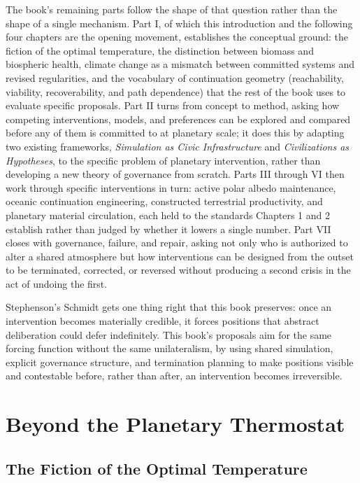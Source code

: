 \documentclass[11pt,oneside]{book}
\begin{document}
The book's remaining parts follow the shape of that question rather than the shape of a single mechanism. Part I, of which this introduction and the following four chapters are the opening movement, establishes the conceptual ground: the fiction of the optimal temperature, the distinction between biomass and biospheric health, climate change as a mismatch between committed systems and revised regularities, and the vocabulary of continuation geometry (reachability, viability, recoverability, and path dependence) that the rest of the book uses to evaluate specific proposals. Part II turns from concept to method, asking how competing interventions, models, and preferences can be explored and compared before any of them is committed to at planetary scale; it does this by adapting two existing frameworks, \textit{Simulation as Civic Infrastructure} and \textit{Civilizations as Hypotheses}, to the specific problem of planetary intervention, rather than developing a new theory of governance from scratch. Parts III through VI then work through specific interventions in turn: active polar albedo maintenance, oceanic continuation engineering, constructed terrestrial productivity, and planetary material circulation, each held to the standards Chapters 1 and 2 establish rather than judged by whether it lowers a single number. Part VII closes with governance, failure, and repair, asking not only who is authorized to alter a shared atmosphere but how interventions can be designed from the outset to be terminated, corrected, or reversed without producing a second crisis in the act of undoing the first.

Stephenson's Schmidt gets one thing right that this book preserves: once an intervention becomes materially credible, it forces positions that abstract deliberation could defer indefinitely. This book's proposals aim for the same forcing function without the same unilateralism, by using shared simulation, explicit governance structure, and termination planning to make positions visible and contestable before, rather than after, an intervention becomes irreversible.

\part{Beyond the Planetary Thermostat}

\chapter{The Fiction of the Optimal Temperature}
\end{document}
